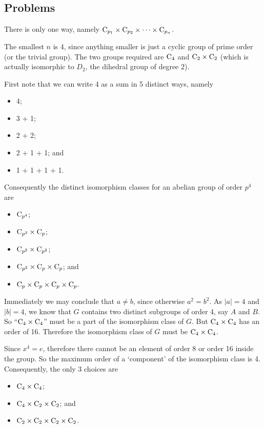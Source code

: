 \subsection*{Problems}
\begin{questions}
    \item There is only one way, namely $\mathrm{C}_{p_1}\times\mathrm{C}_{p_2}\times\cdots\times\mathrm{C}_{p_n}$.

    \item The smallest $n$ is 4, since anything smaller is just a cyclic group of prime order (or the trivial group). The two groups required are $\mathrm{C}_{4}$ and $\mathrm{C}_{2} \times \mathrm{C}_{2}$ (which is actually isomorphic to $D_2$, the dihedral group of degree 2).

    \item First note that we can write 4 as a sum in 5 distinct ways, namely
    \begin{itemize}
        \item 4;
        \item 3 + 1;
        \item 2 + 2;
        \item 2 + 1 + 1; and
        \item 1 + 1 + 1 + 1.
    \end{itemize}
    Consequently the distinct isomorphism classes for an abelian group of order $p^4$ are
    \begin{itemize}
        \item $\mathrm{C}_{p^4}$;
        \item $\mathrm{C}_{p^3}\times\mathrm{C}_{p}$;
        \item $\mathrm{C}_{p^2}\times\mathrm{C}_{p^2}$;
        \item $\mathrm{C}_{p^2}\times\mathrm{C}_{p}\times\mathrm{C}_{p}$; and
        \item $\mathrm{C}_{p}\times\mathrm{C}_{p}\times\mathrm{C}_{p}\times\mathrm{C}_{p}$.
    \end{itemize}

    \item Immediately we may conclude that $a \neq b$, since otherwise $a^2 = b^2$. As $|a| = 4$ and $|b| = 4$, we know that $G$ contains two distinct subgroups of order 4, say $A$ and $B$. So ``$\mathrm{C}_{4} \times \mathrm{C}_{4}$'' must be a part of the isomorphism class of $G$. But $\mathrm{C}_{4} \times \mathrm{C}_{4}$ has an order of 16. Therefore the isomorphism class of $G$ must be $\mathrm{C}_{4} \times \mathrm{C}_{4}$.

    \item Since $x^4 = e$, therefore there cannot be an element of order 8 or order 16 inside the group. So the maximum order of a `component' of the isomorphism class is 4. Consequently, the only 3 choices are
    \begin{itemize}
        \item $\mathrm{C}_{4}\times\mathrm{C}_{4}$;
        \item $\mathrm{C}_{4}\times\mathrm{C}_{2}\times\mathrm{C}_{2}$; and
        \item $\mathrm{C}_{2}\times\mathrm{C}_{2}\times\mathrm{C}_{2}\times\mathrm{C}_{2}$.
    \end{itemize}
\end{questions}
